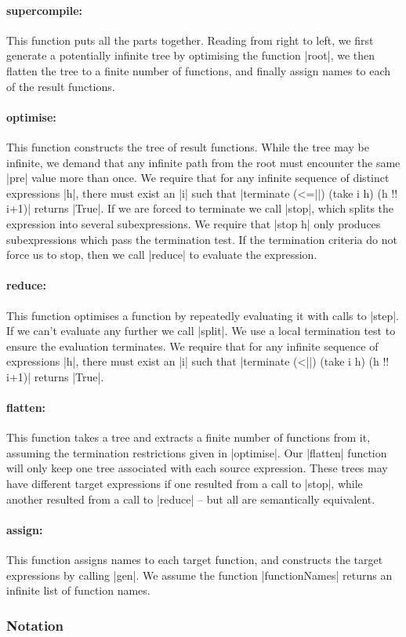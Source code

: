 \documentclass[draft]{sigplanconf}
\begin{document}
\newcommand{\function}[1]{\paragraph{\textsf{#1:}}\hspace{-3mm}}

\function{supercompile} This function puts all the parts together. Reading from right to left, we first generate a potentially infinite tree by optimising the function |root|, we then flatten the tree to a finite number of functions, and finally assign names to each of the result functions.

\function{optimise} This function constructs the tree of result functions. While the tree may be infinite, we demand that any infinite path from the root must encounter the same |pre| value more than once. We require that for any infinite sequence of distinct expressions |h|, there must exist an |i| such that |terminate (<=||) (take i h) (h !! i+1)| returns |True|. If we are forced to terminate we call |stop|, which splits the expression into several subexpressions. We require that |stop h| only produces subexpressions which pass the termination test. If the termination criteria do not force us to stop, then we call |reduce| to evaluate the expression.

\function{reduce} This function optimises a function by repeatedly evaluating it with calls to |step|. If we can't evaluate any further we call |split|. We use a local termination test to ensure the evaluation terminates. We require that for any infinite sequence of expressions |h|, there must exist an |i| such that |terminate (<||) (take i h) (h !! i+1)| returns |True|.

\function{flatten} This function takes a tree and extracts a finite number of functions from it, assuming the termination restrictions given in |optimise|. Our |flatten| function will only keep one tree associated with each source expression. These trees may have different target expressions if one resulted from a call to |stop|, while another resulted from a call to |reduce| -- but all are semantically equivalent.

\function{assign} This function assigns names to each target function, and constructs the target expressions by calling |gen|. We assume the function |functionNames| returns an infinite list of function names.

\subsubsection{Notation}
\label{sec:child_notation}
\end{document}
